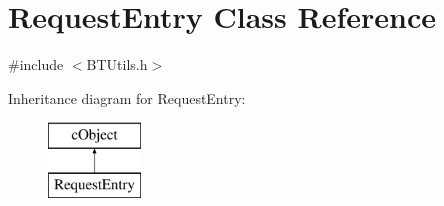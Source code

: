 \hypertarget{classRequestEntry}{}\section{Request\+Entry Class Reference}
\label{classRequestEntry}


{\ttfamily \#include $<$B\+T\+Utils.\+h$>$}

Inheritance diagram for Request\+Entry\+:\begin{figure}[H]
\begin{center}
\leavevmode
\includegraphics[height=2.000000cm]{classRequestEntry}
\end{center}
\end{figure}
